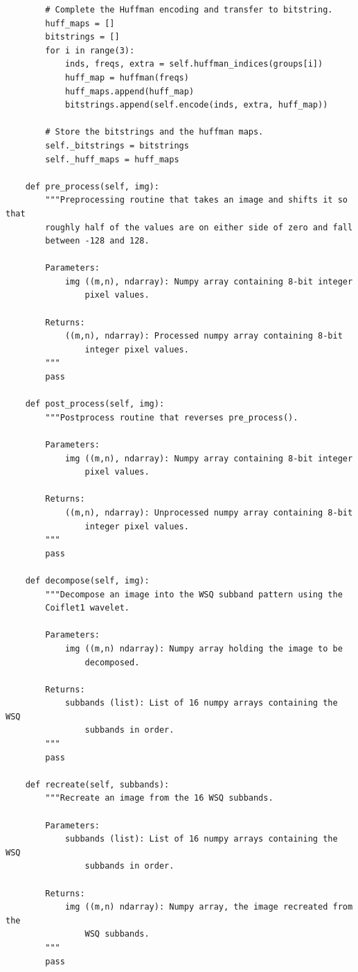 \begin{lstlisting}
        # Complete the Huffman encoding and transfer to bitstring.
        huff_maps = []
        bitstrings = []
        for i in range(3):
            inds, freqs, extra = self.huffman_indices(groups[i])
            huff_map = huffman(freqs)
            huff_maps.append(huff_map)
            bitstrings.append(self.encode(inds, extra, huff_map))

        # Store the bitstrings and the huffman maps.
        self._bitstrings = bitstrings
        self._huff_maps = huff_maps

    def pre_process(self, img):
        """Preprocessing routine that takes an image and shifts it so that
        roughly half of the values are on either side of zero and fall
        between -128 and 128.

        Parameters:
            img ((m,n), ndarray): Numpy array containing 8-bit integer
                pixel values.

        Returns:
            ((m,n), ndarray): Processed numpy array containing 8-bit
                integer pixel values.
        """
        pass

    def post_process(self, img):
        """Postprocess routine that reverses pre_process().

        Parameters:
            img ((m,n), ndarray): Numpy array containing 8-bit integer
                pixel values.

        Returns:
            ((m,n), ndarray): Unprocessed numpy array containing 8-bit
                integer pixel values.
        """
        pass

    def decompose(self, img):
        """Decompose an image into the WSQ subband pattern using the
        Coiflet1 wavelet.

        Parameters:
            img ((m,n) ndarray): Numpy array holding the image to be
                decomposed.

        Returns:
            subbands (list): List of 16 numpy arrays containing the WSQ
                subbands in order.
        """
        pass

    def recreate(self, subbands):
        """Recreate an image from the 16 WSQ subbands.

        Parameters:
            subbands (list): List of 16 numpy arrays containing the WSQ
                subbands in order.

        Returns:
            img ((m,n) ndarray): Numpy array, the image recreated from the
                WSQ subbands.
        """
        pass


\end{lstlisting}
